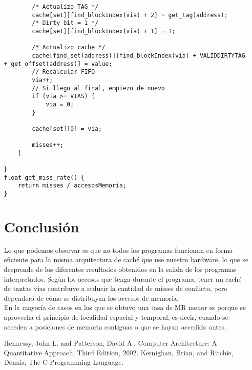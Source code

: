 \documentclass[a4paper, 10pt, twoside, notitlepage]{article}
\begin{document}
\begin{lstlisting}
        /* Actualizo TAG */
        cache[set][find_blockIndex(via) + 2] = get_tag(address);
        /* Dirty bit = 1 */
        cache[set][find_blockIndex(via) + 1] = 1;

        /* Actualizo cache */
        cache[find_set(address)][find_blockIndex(via) + VALIDDIRTYTAG + get_offset(address)] = value;
        // Recalcular FIFO
        via++;
        // Si llego al final, empiezo de nuevo
        if (via >= VIAS) {
            via = 0;
        }

        cache[set][0] = via;

        misses++;
    }

}
float get_miss_rate() {
    return misses / accesosMemoria;
}
\end{lstlisting}
\section{Conclusión}
Lo que podemos observar es que no todos los programas funcionan en forma eficiente para la misma arquitectura de caché que use nuestro hardware, lo que se desprende de los diferentes resultados obtenidos en la salida de los programas interpretados.
Según los accesos que tenga durante el programa, tener un caché de tantas vías contribuye a reducir la cantidad de misses de conflicto, pero dependerá de cómo se distribuyan los accesos de memoria. \\
En la mayoría de casos en los que se obtuvo una tasa de MR menor es porque se aprovecha el principio de localidad espacial y temporal, es decir, cuando se acceden a posiciones de memoria contiguas o que se hayan accedido antes.
\vspace{.5cm}
\begin{thebibliography}{5}
 \bibitem{} Hennessy, John L. and Patterson, David A., Computer Architecture: A Quantitative Approach, Third Edition, 2002.
 \bibitem{} Kernighan, Brian, and Ritchie, Dennis, The C Programming Language.
\end{thebibliography}

\clearpage




\end{document}
